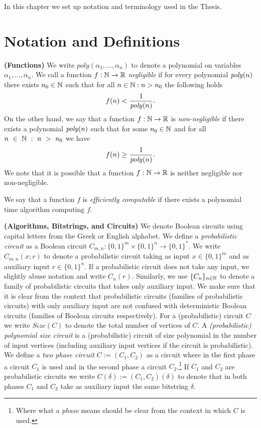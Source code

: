 In this chapter we set up notation and terminology used in the Thesis.
%
\section{Notation and Definitions}
\textbf{(Functions)}
We write $\mathit{poly}(\alpha_1, \dots, \alpha_n)$ to denote a polynomial on variables $\alpha_1, \dots, \alpha_n$.
We call a function $f: \mathbb{N} \rightarrow \mathbb{R}$ \textit{negligible} if for every polynomial $\operatorname{\mathit{poly}}(n)$
there exists $n_0 \in \mathbb{N}$ such that for all $n \in \mathbb{N} : n > n_0$ the following holds
\begin{align*}
f(n) < \frac{1}{\operatorname{\mathit{poly}}(n)}.
\end{align*}
On the other hand, we say that a function $f: \mathbb{N} \rightarrow \mathbb{R}$ is \textit{non-negligible} if
there exists a polynomial $\operatorname{\mathit{poly}}(n)$ such that for some $n_0 \in \mathbb{N}$ and for all $n~\in~\mathbb{N}~:~n~>~n_0$ we have
\begin{align*}
  f(n) \geq \frac{1}{\operatorname{\mathit{poly}}(n)}.
\end{align*}
We note that it is possible that a function $f:\mathbb{N} \rightarrow \mathbb{R}$ is neither negligible nor non-negligible.

We say that a function $f$ is \textit{efficiently computable} if there exists a polynomial time algorithm computing $f$.

\textbf{(Algorithms, Bitstrings, and Circuits)}
We denote Boolean circuits using capital letters from the Greek or English alphabet.
We define a \textit{probabilistic circuit} as a Boolean circuit $C_{m,n} : \{0,1\}^{m} \times \{0,1\}^{n} \rightarrow \{0,1\}^{*}$.
We write $C_{m,n}(x;r)$ to denote a probabilistic circuit taking as input  $x \in \{0,1\}^{m}$ and as auxiliary input $r \in \{0,1\}^{n}$.
If a probabilistic circuit does not take any input, we slightly abuse notation and write $C_{n}(r)$.
Similarly, we use $\{C_n\}_{n \in \mathbb{N}}$ to denote a family of probabilistic circuits that takes only auxiliary input.
We make sure that it is clear from the context that probabilistic circuits (families of probabilistic circuits) with only auxiliary input
are not confused with deterministic Boolean circuits (families of Boolean circuits respectively).
For a (probabilistic) circuit $C$ we write $\mathit{Size}(C)$ to denote the total number of vertices of $C$.
A \textit{(probabilistic) polynomial size circuit} is a (probabilistic) circuit of size polynomial in the number of input vertices
(including auxiliary input vertices if the circuit is probabilistic).
We define a \textit{two phase circuit} $C := (C_1, C_2)$ as a circuit where in the first phase a circuit $C_1$ is used and in the second phase a circuit $C_2$.\footnote{
Where what a \textit{phase} means should be clear from the context in which $C$ is used.}
If $C_1$ and $C_2$ are probabilistic circuits we write $C(\delta) := (C_1, C_2)(\delta)$ to denote that in both phases $C_1$ and $C_2$ take
as auxiliary input the same bitstring $\delta$.


